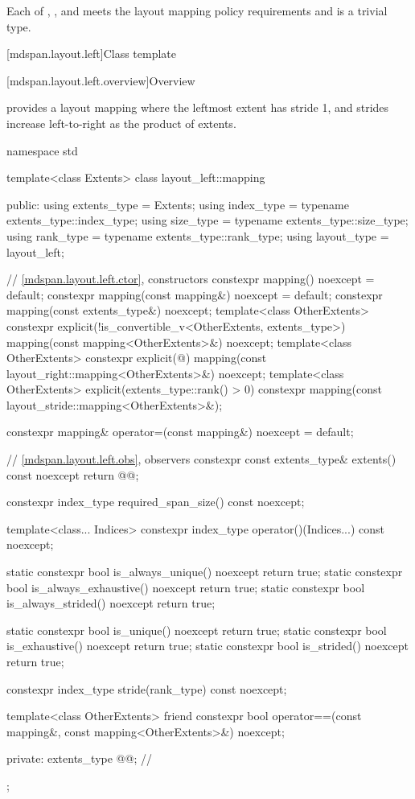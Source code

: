 \pnum
Each of , , and 
meets the layout mapping policy requirements and is a trivial type.

[mdspan.layout.left]{Class template }

[mdspan.layout.left.overview]{Overview}

\pnum
{} provides a layout mapping
where the leftmost extent has stride 1, and
strides increase left-to-right as the product of extents.

\begin{codeblock}
namespace std {
  template<class Extents>
  class layout_left::mapping {
  public:
    using extents_type = Extents;
    using index_type = typename extents_type::index_type;
    using size_type = typename extents_type::size_type;
    using rank_type = typename extents_type::rank_type;
    using layout_type = layout_left;

    // \ref{mdspan.layout.left.ctor}, constructors
    constexpr mapping() noexcept = default;
    constexpr mapping(const mapping&) noexcept = default;
    constexpr mapping(const extents_type&) noexcept;
    template<class OtherExtents>
      constexpr explicit(!is_convertible_v<OtherExtents, extents_type>)
        mapping(const mapping<OtherExtents>&) noexcept;
    template<class OtherExtents>
      constexpr explicit(@\seebelow@)
        mapping(const layout_right::mapping<OtherExtents>&) noexcept;
    template<class OtherExtents>
      explicit(extents_type::rank() > 0)
      constexpr mapping(const layout_stride::mapping<OtherExtents>&);

    constexpr mapping& operator=(const mapping&) noexcept = default;

    // \ref{mdspan.layout.left.obs}, observers
    constexpr const extents_type& extents() const noexcept { return @@; }

    constexpr index_type required_span_size() const noexcept;

    template<class... Indices>
      constexpr index_type operator()(Indices...) const noexcept;

    static constexpr bool is_always_unique() noexcept { return true; }
    static constexpr bool is_always_exhaustive() noexcept { return true; }
    static constexpr bool is_always_strided() noexcept { return true; }

    static constexpr bool is_unique() noexcept { return true; }
    static constexpr bool is_exhaustive() noexcept { return true; }
    static constexpr bool is_strided() noexcept { return true; }

    constexpr index_type stride(rank_type) const noexcept;

    template<class OtherExtents>
      friend constexpr bool operator==(const mapping&, const mapping<OtherExtents>&) noexcept;

  private:
    extents_type @@{};    // \expos
  };
}
\end{codeblock}

